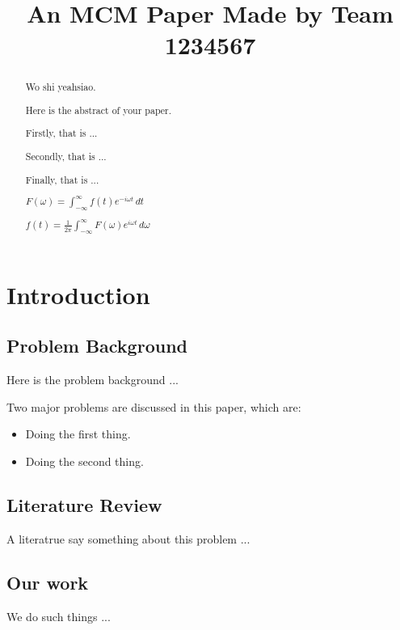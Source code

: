 \documentclass[12pt]{article}  %
\title{An MCM Paper Made by Team 1234567}  %
\begin{document}
\begin{abstract}





Wo shi yeahsiao.

    Here is the abstract of your paper.

    Firstly, that is ...

    Secondly, that is ...

    Finally, that is ...

$F(\omega) = \int_{-\infty}^{\infty} f(t) e^{-i \omega t} \, dt$


$f(t) = \frac{1}{2\pi} \int_{-\infty}^{\infty} F(\omega) e^{i \omega t} \, d\omega$


\end{abstract}

\maketitle  %
\tableofcontents  %


\section{Introduction}
\subsection{Problem Background}
Here is the problem background ...

Two major problems are discussed in this paper, which are:
\begin{itemize}
    \item Doing the first thing.
    \item Doing the second thing.
\end{itemize}

\subsection{Literature Review}
A literatrue\cite{1} say something about this problem ...

\subsection{Our work}
We do such things ...
\end{document}
